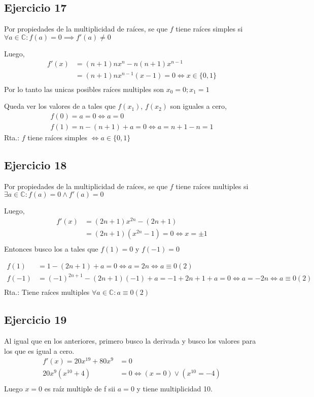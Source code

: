 \subsection{Ejercicio 17}
Por propiedades de la multiplicidad de raíces, se que $ f $ tiene raíces simples si $ \forall a \in \mathbb{C}: f(a) = 0 \implies f'(a) \neq 0 $

Luego,
\begin{align*}
    f'(x) &= (n+1)n x^n -n(n+1)x^{n-1} \\
    &= (n+1)n x^{n-1} (x-1) = 0 \iff x \in \{ 0,1 \} \\
\end{align*}
Por lo tanto las unicas posibles raíces multiples son $ x_0 = 0; x_1 = 1 $

Queda ver los valores de a tales que $f(x_1)$, $f(x_2)$ son iguales a cero,
\begin{align*}
    f(0) = a = 0 \iff a = 0 \\
    f(1) = n-(n+1) + a = 0 \iff a = n+1-n = 1
\end{align*}
Rta.: $f$ tiene raíces simples $ \iff a \in \{ 0, 1 \} $

\subsection{Ejercicio 18}
Por propiedades de la multiplicidad de raíces, se que $ f $ tiene raíces multiples si $ \exists a \in \mathbb{C}: f(a) = 0 \wedge f'(a) = 0 $

Luego,
\begin{align*}
    f'(x) &= (2n+1)x^{2n} - (2n+1) \\
    &= (2n+1)(x^{2n} - 1) = 0 \iff x = \pm 1 \\
\end{align*}
Entonces busco los a tales que $f(1) = 0$ y $f(-1) = 0$

\begin{align*}
    f(1) &= 1-(2n+1) +a = 0 \iff a = 2n \iff a \equiv 0(2)\\
    f(-1) &= (-1)^{2n+1}-(2n+1)(-1) +a = -1+2n+1+a = 0 \iff a = -2n \iff a \equiv 0(2) \\
\end{align*}
Rta.: Tiene raíces multiples $ \forall a \in \mathbb{C}: a \equiv 0(2) $

\subsection{Ejercicio 19}
Al igual que en los anteriores, primero busco la derivada y busco los valores para los que es igual a cero.
\begin{align*}
    f'(x) = 20x^{19} + 80x^9 &= 0 \\
    20x^{9}(x^{10} + 4) &= 0 \iff (x = 0) \vee (x^{10} = -4) \\
\end{align*}
Luego $ x = 0 $ es raíz multiple de f sii $a = 0$ y tiene multiplicidad 10.

